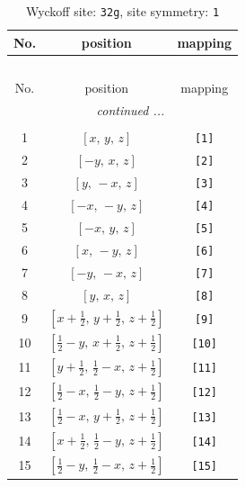 \documentclass[fleqn,8pt]{jsarticle}
\begin{document}
\renewcommand{\arraystretch}{1.2}
\begin{longtable}{ccc}
\caption{Wyckoff site: {\tt 32g}, site symmetry: {\tt 1}}
 \\
 \hline \hline
No. & position & mapping \\ \hline \endfirsthead

\multicolumn{2}{l}{\tablename\ \thetable{}} \\
 \hline \hline
No. & position & mapping \\ \hline \endhead

 \hline \hline
\multicolumn{2}{r}{\footnotesize\it continued ...} \\ \endfoot

 \hline \hline
\multicolumn{2}{r}{} \\ \endlastfoot

1 & $\left[ x,\, y,\, z \right]$ & {\tt [1]} \\ \hline
2 & $\left[ - y,\, x,\, z \right]$ & {\tt [2]} \\ \hline
3 & $\left[ y,\, - x,\, z \right]$ & {\tt [3]} \\ \hline
4 & $\left[ - x,\, - y,\, z \right]$ & {\tt [4]} \\ \hline
5 & $\left[ - x,\, y,\, z \right]$ & {\tt [5]} \\ \hline
6 & $\left[ x,\, - y,\, z \right]$ & {\tt [6]} \\ \hline
7 & $\left[ - y,\, - x,\, z \right]$ & {\tt [7]} \\ \hline
8 & $\left[ y,\, x,\, z \right]$ & {\tt [8]} \\ \hline
9 & $\left[ x + \frac{1}{2},\, y + \frac{1}{2},\, z + \frac{1}{2} \right]$ & {\tt [9]} \\ \hline
10 & $\left[ \frac{1}{2} - y,\, x + \frac{1}{2},\, z + \frac{1}{2} \right]$ & {\tt [10]} \\ \hline
11 & $\left[ y + \frac{1}{2},\, \frac{1}{2} - x,\, z + \frac{1}{2} \right]$ & {\tt [11]} \\ \hline
12 & $\left[ \frac{1}{2} - x,\, \frac{1}{2} - y,\, z + \frac{1}{2} \right]$ & {\tt [12]} \\ \hline
13 & $\left[ \frac{1}{2} - x,\, y + \frac{1}{2},\, z + \frac{1}{2} \right]$ & {\tt [13]} \\ \hline
14 & $\left[ x + \frac{1}{2},\, \frac{1}{2} - y,\, z + \frac{1}{2} \right]$ & {\tt [14]} \\ \hline
15 & $\left[ \frac{1}{2} - y,\, \frac{1}{2} - x,\, z + \frac{1}{2} \right]$ & {\tt [15]} \\ \hline

\end{longtable}
\end{document}
